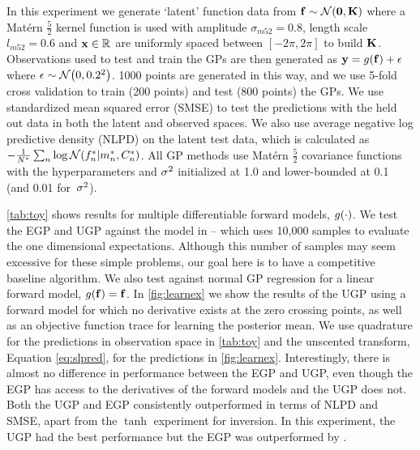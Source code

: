 \documentclass{article} %
\begin{document}
In this experiment we generate `latent' function data from $\mathbf{f} \sim
\mathcal{N}\!\left({\mathbf{0}, \mathbf{K}}\right)$ where a Mat\'ern $\frac{5}{2}$ kernel function is
used with amplitude $\sigma_{m52} = 0.8$, length scale $l_{m52} = 0.6$ and
$\mathbf{x} \in \mathbb{R}^{}$ are uniformly spaced between $[-2\pi, 2\pi]$ to build
$\mathbf{K}$. Observations used to test and train the GPs are then generated as
$\mathbf{y} = g\!\left({{\mathbf{f}}}\right) + \epsilon$ where $\epsilon \sim \mathcal{N}\!\left({0, 0.2^2}\right)$.
1000 points are generated in this way, and we use 5-fold cross validation to
train (200 points) and test (800 points) the GPs. We use standardized mean
squared error (SMSE) to test the predictions with the held out data in both the
latent and observed spaces. We also use  average negative log predictive
density (NLPD) on the latent test data, which is calculated as
$-\frac{1}{N^{*}} \sum_{n} \log \mathcal{N}\!\left({f_n^{*}}\middle\vert{\ensuremath{m}_n\ensuremath{^{*}},
    \ensuremath{C}_n\ensuremath{^{*}}}\right)$. All  GP methods use Mat\'ern $\frac{5}{2}$ covariance
functions with the hyperparameters and $\sigma^2$ initialized at 1.0 and
lower-bounded at 0.1 (and 0.01 for~$\sigma^2$).

\autoref{tab:toy} shows results for multiple differentiable forward models,
$g\!\left({{\cdot}}\right)$. We test the EGP and UGP against the model in \cite{Opper2009}
-- which uses 10,000 samples to evaluate the one dimensional expectations.
Although this number of samples may seem excessive for these simple problems,
our goal here is to have a competitive baseline algorithm. We also test against
normal GP regression for a linear forward model, $g\!\left({{\mathbf{f}}}\right) = \mathbf{f}$.
In \autoref{fig:learnex} we show the results of the UGP using a forward model
for which no derivative exists at the zero crossing points, as well as an
objective function trace for learning the posterior mean. We use quadrature for
the predictions in observation space in \autoref{tab:toy} and the unscented
transform, Equation \eqref{eq:slpred}, for the predictions in
\autoref{fig:learnex}. Interestingly, there is almost no difference in
performance between the EGP and UGP, even though the EGP has access to the
derivatives of the forward models and the UGP does not.  Both the UGP and EGP
consistently outperformed \cite{Opper2009} in terms of NLPD and  SMSE, apart
from the $\tanh$ experiment for inversion. In this experiment, the UGP had the
best performance but the EGP was outperformed by \cite{Opper2009}.

\end{document}
